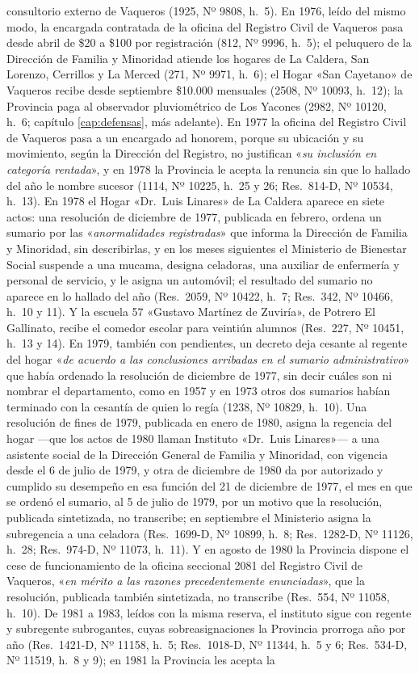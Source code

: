 consultorio externo de Vaqueros (1925, Nº 9808, h.\ 5). En 1976, leído del mismo modo, la encargada contratada de la oficina del Registro Civil de Vaqueros pasa desde abril de \$20 a \$100 por registración (812, Nº 9996, h.\ 5); el peluquero de la Dirección de Familia y Minoridad atiende los hogares de La Caldera, San Lorenzo, Cerrillos y La Merced (271, Nº 9971, h.\ 6); el Hogar «San Cayetano» de Vaqueros recibe desde septiembre \$10.000 mensuales (2508, Nº 10093, h.\ 12); la Provincia paga al observador pluviométrico de Los Yacones (2982, Nº 10120, h.\ 6; capítulo \ref{cap:defensas}, más adelante). En 1977 la oficina del Registro Civil de Vaqueros pasa a un encargado ad honorem, porque su ubicación y su movimiento, según la Dirección del Registro, no justifican «\textit{su inclusión en categoría rentada}», y en 1978 la Provincia le acepta la renuncia sin que lo hallado del año le nombre sucesor (1114, Nº 10225, h.\ 25 y 26; Res.\ 814-D, Nº 10534, h.\ 13). En 1978 el Hogar «Dr.\ Luis Linares» de La Caldera aparece en siete actos: una resolución de diciembre de 1977, publicada en febrero, ordena un sumario por las «\textit{anormalidades registradas}» que informa la Dirección de Familia y Minoridad, sin describirlas, y en los meses siguientes el Ministerio de Bienestar Social suspende a una mucama, designa celadoras, una auxiliar de enfermería y personal de servicio, y le asigna un automóvil; el resultado del sumario no aparece en lo hallado del año (Res.\ 2059, Nº 10422, h.\ 7; Res.\ 342, Nº 10466, h.\ 10 y 11). Y la escuela 57 «Gustavo Martínez de Zuviría», de Potrero El Gallinato, recibe el comedor escolar para veintiún alumnos (Res.\ 227, Nº 10451, h.\ 13 y 14). En 1979, también con pendientes, un decreto deja cesante al regente del hogar «\textit{de acuerdo a las conclusiones arribadas en el sumario administrativo}» que había ordenado la resolución de diciembre de 1977, sin decir cuáles son ni nombrar el departamento, como en 1957 y en 1973 otros dos sumarios habían terminado con la cesantía de quien lo regía (1238, Nº 10829, h.\ 10). Una resolución de fines de 1979, publicada en enero de 1980, asigna la regencia del hogar ---que los actos de 1980 llaman Instituto «Dr.\ Luis Linares»--- a una asistente social de la Dirección General de Familia y Minoridad, con vigencia desde el 6 de julio de 1979, y otra de diciembre de 1980 da por autorizado y cumplido su desempeño en esa función del 21 de diciembre de 1977, el mes en que se ordenó el sumario, al 5 de julio de 1979, por un motivo que la resolución, publicada sintetizada, no transcribe; en septiembre el Ministerio asigna la subregencia a una celadora (Res.\ 1699-D, Nº 10899, h.\ 8; Res.\ 1282-D, Nº 11126, h.\ 28; Res.\ 974-D, Nº 11073, h.\ 11). Y en agosto de 1980 la Provincia dispone el cese de funcionamiento de la oficina seccional 2081 del Registro Civil de Vaqueros, «\textit{en mérito a las razones precedentemente enunciadas}», que la resolución, publicada también sintetizada, no transcribe (Res.\ 554, Nº 11058, h.\ 10). De 1981 a 1983, leídos con la misma reserva, el instituto sigue con regente y subregente subrogantes, cuyas sobreasignaciones la Provincia prorroga año por año (Res.\ 1421-D, Nº 11158, h.\ 5; Res.\ 1018-D, Nº 11344, h.\ 5 y 6; Res.\ 534-D, Nº 11519, h.\ 8 y 9); en 1981 la Provincia les acepta la 